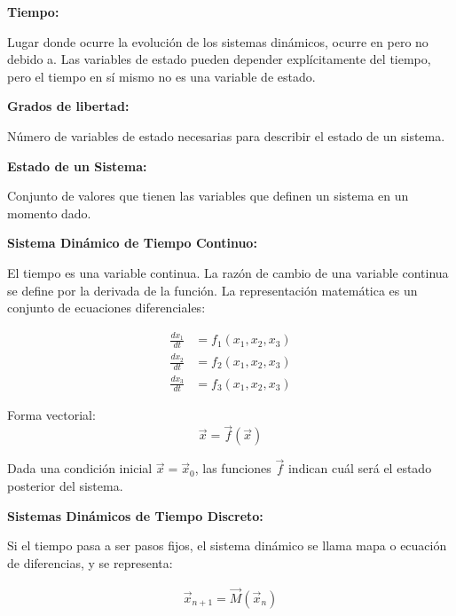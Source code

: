 \documentclass[12pt]{article}
\begin{document}
\begin{tcolorbox}
  \textbf{\LARGE Tiempo:}

  Lugar donde ocurre la evolución de los sistemas dinámicos, ocurre en pero no debido a. Las variables de estado pueden depender explícitamente del tiempo, pero el tiempo en sí mismo no es una variable de estado.
\end{tcolorbox}


\begin{tcolorbox}
  \textbf{\LARGE Grados de libertad:}

  Número de variables de estado necesarias para describir el estado de un sistema.
\end{tcolorbox}

\begin{tcolorbox}
  \textbf{\LARGE Estado de un Sistema:}

  Conjunto de valores que tienen las variables que definen un sistema en un momento dado.
\end{tcolorbox}

\begin{tcolorbox}
  \textbf{\LARGE Sistema Dinámico de Tiempo Continuo:}

  El tiempo es una variable continua. La razón de cambio de una variable continua se define por la derivada de la función. La representación matemática es un conjunto de ecuaciones diferenciales:

  \begin{align*}
    \frac{dx_1}{dt} &= f_1 (x_1, x_2, x_3) \\
    \frac{dx_2}{dt} &= f_2 (x_1, x_2, x_3) \\
    \frac{dx_3}{dt} &= f_3 (x_1, x_2, x_3)
  \end{align*}

  Forma vectorial:
  \[
  \vec{x} = \vec{f} (\vec{x})
  \]

  Dada una condición inicial \(\vec{x} = \vec{x}_0\), las funciones \(\vec{f}\) indican cuál será el estado posterior del sistema.
\end{tcolorbox}
\begin{tcolorbox}
  \textbf{\LARGE Sistemas Dinámicos de Tiempo Discreto:}

  Si el tiempo pasa a ser pasos fijos, el sistema dinámico se llama mapa o ecuación de diferencias, y se representa:

  \begin{align*}
    \vec{x}_{n+1} = \vec{M} (\vec{x}_n)
  \end{align*}
\end{tcolorbox}
\end{document}
